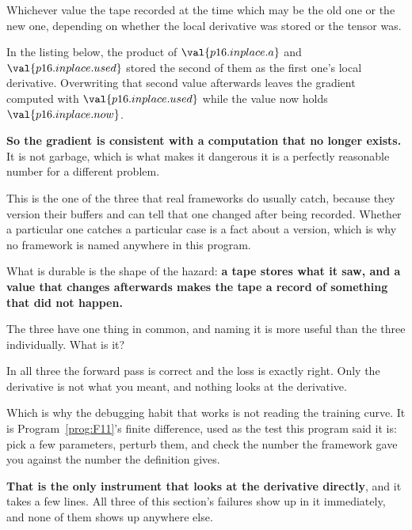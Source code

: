 \begin{fr}
\begin{ansblock}
Whichever value the tape recorded at the time \dash{} which may be the old one
or the new one, depending on whether the local derivative was stored or the
tensor was.
\end{ansblock}

In the listing below, the product of $\val{p16.inplace.a}$ and
$\val{p16.inplace.used}$ stored the second of them as the first one's local
derivative. Overwriting that second value afterwards leaves the gradient
computed with $\val{p16.inplace.used}$ while the value now holds
$\val{p16.inplace.now}$.


\textbf{So the gradient is consistent with a computation that no longer
exists.} It is not garbage, which is what makes it dangerous \dash{} it is a
perfectly reasonable number for a different problem.

\begin{note}
This is the one of the three that real frameworks do usually catch, because
they version their buffers and can tell that one changed after being recorded.
Whether a particular one catches a particular case is a fact about a version,
which is why no framework is named anywhere in this program.

What is durable is the shape of the hazard: \textbf{a tape stores what it saw,
and a value that changes afterwards makes the tape a record of something that
did not happen.}
\end{note}
\end{fr}

\begin{fr}
The three have one thing in common, and naming it is more useful than the
three individually. What is it?
\dotline
\nextframe
\end{fr}

\begin{fr}
\begin{ansblock}
In all three the forward pass is correct and the loss is exactly right. Only
the derivative is not what you meant, and nothing looks at the derivative.
\end{ansblock}

Which is why the debugging habit that works is not reading the training curve.
It is Program~\ref{prog:F11}'s finite difference, used as the test this
program said it is: pick a few parameters, perturb them, and check the number
the framework gave you against the number the definition gives.

\textbf{That is the only instrument that looks at the derivative directly},
and it takes a few lines. All three of this section's failures show up in it
immediately, and none of them shows up anywhere else.
\end{fr}


